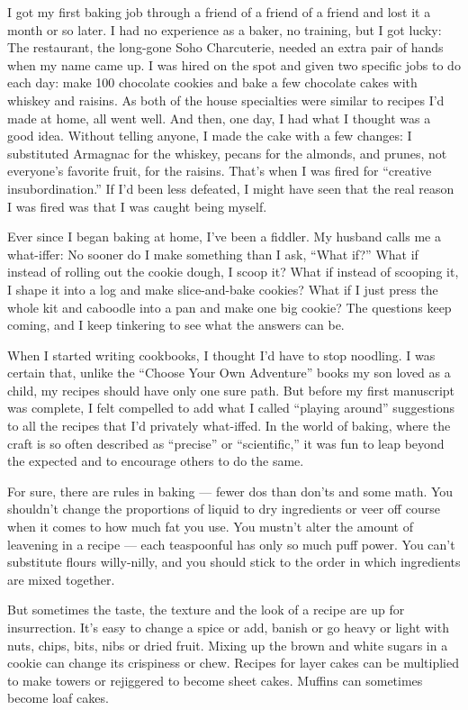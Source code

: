 I got my first baking job through a friend of a friend of a friend and
lost it a month or so later. I had no experience as a baker, no
training, but I got lucky: The restaurant, the long-gone Soho
Charcuterie, needed an extra pair of hands when my name came up. I was
hired on the spot and given two specific jobs to do each day: make 100
chocolate cookies and bake a few chocolate cakes with whiskey and
raisins. As both of the house specialties were similar to recipes I'd
made at home, all went well. And then, one day, I had what I thought was
a good idea. Without telling anyone, I made the cake with a few changes:
I substituted Armagnac for the whiskey, pecans for the almonds, and
prunes, not everyone's favorite fruit, for the raisins. That's when I
was fired for ``creative insubordination.'' If I'd been less defeated, I
might have seen that the real reason I was fired was that I was caught
being myself.

Ever since I began baking at home, I've been a fiddler. My husband calls
me a what-iffer: No sooner do I make something than I ask, ``What if?''
What if instead of rolling out the cookie dough, I scoop it? What if
instead of scooping it, I shape it into a log and make slice-and-bake
cookies? What if I just press the whole kit and caboodle into a pan and
make one big cookie? The questions keep coming, and I keep tinkering to
see what the answers can be.

When I started writing cookbooks, I thought I'd have to stop noodling. I
was certain that, unlike the ``Choose Your Own Adventure'' books my son
loved as a child, my recipes should have only one sure path. But before
my first manuscript was complete, I felt compelled to add what I called
``playing around'' suggestions to all the recipes that I'd privately
what-iffed. In the world of baking, where the craft is so often
described as ``precise'' or ``scientific,'' it was fun to leap beyond
the expected and to encourage others to do the same.

For sure, there are rules in baking --- fewer dos than don'ts and some
math. You shouldn't change the proportions of liquid to dry ingredients
or veer off course when it comes to how much fat you use. You mustn't
alter the amount of leavening in a recipe --- each teaspoonful has only
so much puff power. You can't substitute flours willy-nilly, and you
should stick to the order in which ingredients are mixed together.

But sometimes the taste, the texture and the look of a recipe are up for
insurrection. It's easy to change a spice or add, banish or go heavy or
light with nuts, chips, bits, nibs or dried fruit. Mixing up the brown
and white sugars in a cookie can change its crispiness or chew. Recipes
for layer cakes can be multiplied to make towers or rejiggered to become
sheet cakes. Muffins can sometimes become loaf cakes.

